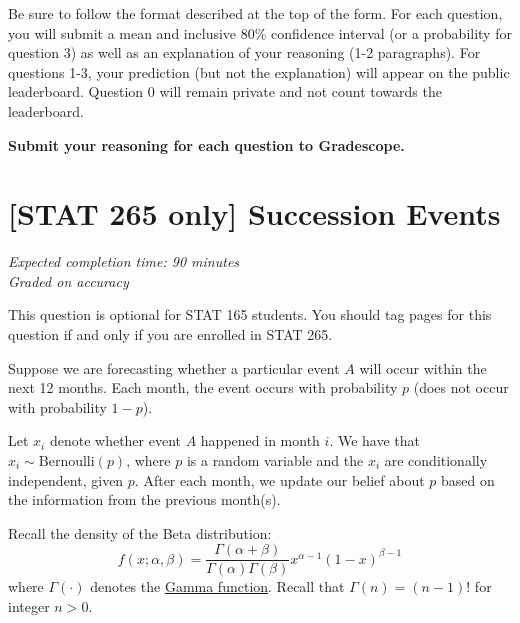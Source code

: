 \documentclass[11pt]{article}
\begin{document}
Be sure to follow the format
described at the top of the form.
For each question, you will submit a mean and inclusive 80\% confidence interval (or a probability
for question 3) as well as an explanation of your reasoning (1-2 paragraphs).
For questions 1-3, your prediction (but not the explanation) will appear on the public leaderboard.
Question 0 will remain private and not count towards the leaderboard.

\textbf{Submit your reasoning for each question to Gradescope.}


\newpage
\section*{[STAT 265 only] Succession Events}
\emph{Expected completion time: 90 minutes} \\
\emph{Graded on accuracy}

This question is optional for STAT 165 students. You should tag pages for this question if and only if you are enrolled in STAT 265.

Suppose we are forecasting whether a particular event $A$ will occur within the next 12 months. Each month, the event occurs with probability $p$ (does not occur with probability $1-p$).

Let $x_i$ denote whether event $A$ happened in month $i$. We have that $x_i \sim \text{Bernoulli}(p)$, where $p$ is a random variable and the $x_i$ are conditionally independent, given $p$. After each month, we update our belief about $p$ based on the information from the previous month(s).

Recall the density of the Beta distribution:
$$
f(x; \alpha, \beta)=\frac{\Gamma(\alpha+\beta)}{\Gamma(\alpha) \Gamma(\beta)} x^{\alpha-1}(1-x)^{\beta-1}
$$ where $\Gamma(\cdot)$ denotes the \href{https://en.wikipedia.org/wiki/Gamma_function}{Gamma function}. Recall that $\Gamma(n) = (n-1)!$ for integer $n>0$.
\end{document}
